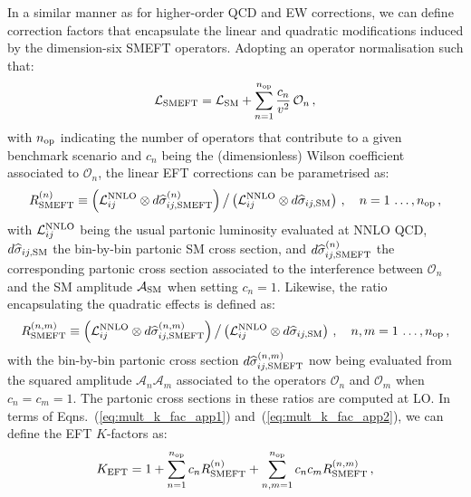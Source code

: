\documentclass[withindex,glossary]{cam-thesis}
\begin{document}
In a similar manner as for higher-order QCD and EW corrections, we can
define correction factors that encapsulate  the linear and quadratic modifications induced
by the dimension-six SMEFT operators.
%
Adopting an operator normalisation such that:
\begin{equation}
\label{eq:lagrangian}
\mathcal{L}_{\rm SMEFT} = \mathcal{L}_{\rm SM} + \sum_{n=1}^{n_{\rm op}} \frac{c_n}{v^2} \,\mathcal{O}_n \, ,
\end{equation}
with $n_{\rm op}$ indicating the number of operators that contribute to a given
benchmark scenario and $c_n$ being the (dimensionless) Wilson coefficient associated to $\mathcal{O}_n$,
the linear EFT corrections can be parametrised as:
%
\begin{equation}
  \label{eq:mult_k_fac_app1}
   R_{\rm SMEFT}^{(n)} \equiv \displaystyle \left( {\cal L}_{ ij}^{\rm NNLO} \otimes d\widehat{\sigma}_{ij,{\rm SMEFT}}^{(n)}\right)
 \big/ \left( {\cal L}_{ ij}^{\rm NNLO} \otimes d\widehat{\sigma}_{ij,{\rm SM}} \right) \, , \quad
 n=1\,\ldots, n_{\rm op} \, ,
\end{equation}
%
with ${\cal L}_{ ij}^{\rm NNLO}$ being the usual partonic luminosity evaluated at NNLO QCD, 
$d\widehat{\sigma}_{ij,{\rm SM}}$
the bin-by-bin partonic SM cross section, and $d\widehat{\sigma}_{ij,{\rm SMEFT}}^{(n)}$
the corresponding partonic cross section associated to the interference between 
$\mathcal{O}_n$ and the SM amplitude $\mathcal{A}_{\rm SM}$ when setting $c_n = 1$.
%
Likewise, the ratio encapsulating the quadratic effects is defined as:
%
\begin{equation}
  \label{eq:mult_k_fac_app2}
  R_{\rm SMEFT}^{(n,m)} \equiv \displaystyle \left( {\cal L}_{ ij}^{\rm NNLO} \otimes d\widehat{\sigma}_{ij,{\rm SMEFT}}^{(n,m)}\right)
  \big/ \left( {\cal L}_{ ij}^{\rm NNLO} \otimes d\widehat{\sigma}_{ij,{\rm SM}} \right) \, , \quad
 n,m=1\,\ldots, n_{\rm op} \, ,
\end{equation}
with the bin-by-bin partonic cross section
$d\widehat{\sigma}_{ij,{\rm SMEFT}}^{(n,m)}$ now being evaluated from the squared amplitude $\mathcal{A}_n\mathcal{A}_m$
associated to the operators $\mathcal{O}_n$ and $\mathcal{O}_m$ when $c_n = c_m = 1$.
%
The partonic cross sections in these ratios are computed at LO.
%
In terms of  Eqns.~(\ref{eq:mult_k_fac_app1}) and~(\ref{eq:mult_k_fac_app2}), we can define the EFT $K$-factors as:
\begin{equation}
 \label{eq:theory_k_fac}
  K_{\rm EFT}= 1+\sum_{n=1}^{n_{\rm op}} c_n R_{\rm SMEFT}^{(n)}
  +\sum_{n,m=1}^{n_{\rm op}} c_n c_m R_{\rm SMEFT}^{(n,m)} \, ,
\end{equation}
\end{document}
